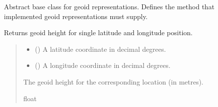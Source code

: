 \documentclass[letterpaper,10pt,english]{sphinxmanual}
\begin{document}
\begin{fulllineitems}
\label{\detokenize{modules/earth/geoid:qnav.earth.geoid.GeoidModel}}
\pysigstartsignatures
{}
\pysigstopsignatures
\sphinxAtStartPar
Abstract base class for geoid representations.
Defines the method that implemented geoid representations must supply.

\begin{fulllineitems}
\label{\detokenize{modules/earth/geoid:qnav.earth.geoid.GeoidModel.get_height}}
\pysigstartsignatures
{}
\pysigstopsignatures
\sphinxAtStartPar
Returns geoid height for single latitude and longitude position.
\begin{quote}\begin{description}
\begin{itemize}
\item {} 
\sphinxAtStartPar
{} () \textendash{} A latitude coordinate in decimal degrees.

\item {} 
\sphinxAtStartPar
{} () \textendash{} A longitude coordinate in decimal degrees.

\end{itemize}

\sphinxAtStartPar
The geoid height for the corresponding location (in metres).

\sphinxAtStartPar
float

\end{description}\end{quote}

\end{fulllineitems}



\end{fulllineitems}
\end{document}
